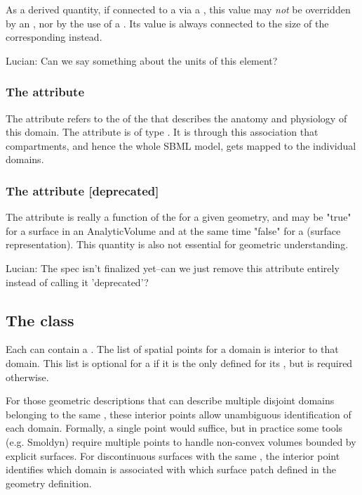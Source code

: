 As a derived quantity, if connected to a \Parameter via a \SpatialSymbolReference, this value may \emph{not} be overridden by an \InitialAssignment, nor by the use of a \Rule.  Its value is always connected to the size of the corresponding \Geometry instead.

{\color{red} Lucian: \notice Can we say something about the units of this element?}

\subsubsection{The  attribute}
The  attribute refers to the  of the \DomainType that describes the anatomy and physiology of this domain. The attribute is of type . It is through this association that compartments, and hence the whole SBML model, gets mapped to the individual domains. 

\subsubsection{The  attribute [deprecated]}
The  attribute is really a function of the \GeometryDefinitions for a given geometry, and may be "true" for a surface in an AnalyticVolume and at the same time "false" for a \ParametricGeometry (surface representation).  This quantity is also not essential for geometric understanding.

{\color{red} Lucian: \notice The spec isn't finalized yet--can we just remove this attribute entirely instead of calling it 'deprecated'?}


\subsection{The  class}
\label{InteriorPoint-class}
Each \Domain can contain a \ListOfInteriorPoints. The list of spatial points for a domain is interior to that domain.  This list is optional for a \Domain if it is the only \Domain defined for its \DomainType, but is required otherwise.

For those geometric descriptions that can describe multiple disjoint domains belonging to the same , these interior points allow unambiguous identification of each domain.  Formally, a single point would suffice, but in practice some tools (e.g. Smoldyn) require multiple points to handle non-convex volumes bounded by explicit surfaces.  For discontinuous surfaces with the same , the interior point identifies which domain is associated with which surface patch defined in the geometry definition.

